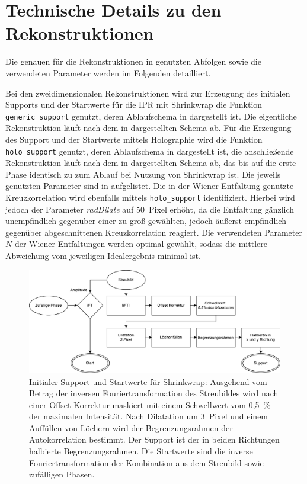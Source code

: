\chapter{Technische Details zu den Rekonstruktionen}
\label{app:param}
Die genauen für die Rekonstruktionen in  genutzten Abfolgen sowie die verwendeten Parameter werden im Folgenden detailliert.

Bei den zweidimensionalen Rekonstruktionen wird zur Erzeugung des initialen Supports und der Startwerte für die IPR mit Shrinkwrap die Funktion \texttt{generic\_support} genutzt, deren Ablaufschema in  dargestellt ist. Die eigentliche Rekonstruktion läuft nach dem in  dargestellten Schema ab.
Für die Erzeugung des Support und der Startwerte mittels Holographie wird die Funktion \texttt{holo\_support} genutzt, deren Ablaufschema in  dargestellt ist, die anschließende Rekonstruktion läuft nach dem in  dargestellten Schema ab, das bis auf die erste Phase identisch zu zum Ablauf bei Nutzung von Shrinkwrap ist.
Die jeweils genutzten Parameter sind in  aufgelistet.
Die in der Wiener-Entfaltung genutzte Kreuzkorrelation wird ebenfalls mittels \texttt{holo\_support} identifiziert. Hierbei wird jedoch der Parameter \textit{radDilate} auf \SI{50}{Pixel} erhöht, da die Entfaltung gänzlich unempfindlich gegenüber einer zu groß gewählten, jedoch äußerst empfindlich gegenüber abgeschnittenen Kreuzkorrelation reagiert. Die verwendeten Parameter $N$ der Wiener-Entfaltungen werden optimal gewählt, sodass die mittlere Abweichung vom jeweiligen Idealergebnis minimal ist.

\begin{figure}
	\centering
	\includegraphics[width=.85\textwidth]{images/flow_genericsupport.pdf}
	\caption[Initialer Support für Shrinkwrap]{Initialer Support und Startwerte für Shrinkwrap: Ausgehend vom Betrag der inversen Fouriertransformation des Streubildes wird nach einer Offset-Korrektur maskiert mit einem Schwellwert vom 0,5~\% der maximalen Intensität. Nach Dilatation um \SI{3}{Pixel} und einem Auffüllen von Löchern wird der Begrenzungsrahmen der Autokorrelation bestimmt. Der Support ist der in beiden Richtungen halbierte Begrenzungsrahmen. Die Startwerte sind die inverse Fouriertransformation der Kombination aus dem Streubild sowie zufälligen Phasen.}
	\label{fig:flow_genericsupport}
\end{figure} 

